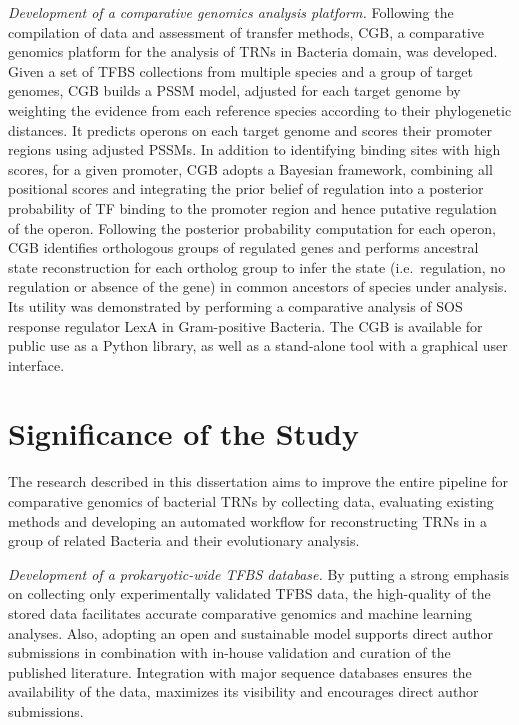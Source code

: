 \textit{Development of a comparative genomics analysis platform.} Following the
compilation of data and assessment of transfer methods, CGB, a comparative
genomics platform for the analysis of TRNs in Bacteria domain, was
developed. Given a set of TFBS collections from multiple species and a group of
target genomes, CGB builds a PSSM model, adjusted for each target genome by
weighting the evidence from each reference species according to their
phylogenetic distances. It predicts operons on each target genome and scores
their promoter regions using adjusted PSSMs. In addition to identifying binding
sites with high scores, for a given promoter, CGB adopts a Bayesian framework,
combining all positional scores and integrating the prior belief of regulation
into a posterior probability of TF binding to the promoter region and hence putative
regulation of the operon. Following the posterior probability computation for
each operon, CGB identifies orthologous groups of regulated genes and performs
ancestral state reconstruction for each ortholog group to infer the state
(i.e.\ regulation, no regulation or absence of the gene) in common ancestors of
species under analysis. Its utility was demonstrated by performing a
comparative analysis of SOS response regulator LexA in Gram-positive
Bacteria. The CGB is available for public use as a Python library, as well as a
stand-alone tool with a graphical user interface.

\section{Significance of the Study}

The research described in this dissertation aims to improve the entire pipeline
for comparative genomics of bacterial TRNs by collecting data, evaluating
existing methods and developing an automated workflow for reconstructing TRNs
in a group of related Bacteria and their evolutionary analysis.

\textit{Development of a prokaryotic-wide TFBS database.}  By putting a strong
emphasis on collecting only experimentally validated TFBS data, the
high-quality of the stored data facilitates accurate comparative genomics and
machine learning analyses. Also, adopting an open and sustainable model
supports direct author submissions in combination with in-house validation and
curation of the published literature. Integration with major sequence databases
ensures the availability of the data, maximizes its visibility and encourages
direct author submissions.

